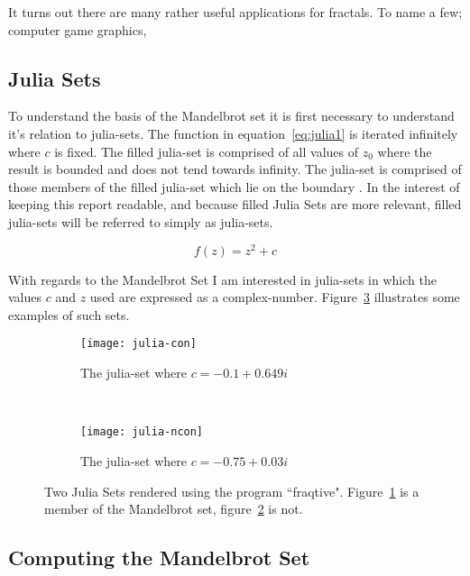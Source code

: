 It turns out there are many rather useful applications for fractals. To name a few; computer game graphics, %

\subsection*{Julia Sets}

To understand the basis of the Mandelbrot set it is first necessary to understand it's relation to \glspl{julia-set}.
The function in equation~\ref{eq:julia1} is iterated infinitely where \(c\) is fixed.
The \gls{filled julia-set} is comprised of all values of \(z_0\) where the result is bounded and does not tend towards infinity.
The \gls{julia-set} is comprised of those members of the \gls{filled julia-set} which lie on the boundary \cite{chaosfract}.
In the interest of keeping this report readable, and because filled Julia Sets are more relevant, \glspl{filled julia-set} will be 
referred to simply as \glspl{julia-set}.

\begin{equation}\label{eq:julia1}
f(z) = z^2 + c
\end{equation}

With regards to the Mandelbrot Set I am interested in \glspl{julia-set} in which the values \(c\) and \(z\) used are expressed as a 
\gls{complex-number}. Figure~\ref{fig:juliaimgs} illustrates some examples of such sets. 

\begin{figure}[h]
\centering
\begin{subfigure}[b]{0.48\textwidth}
  \centering    
  \texttt{[image: julia-con]}
  \caption{
    \tiny The \gls{julia-set} where \(c = -0.1 + 0.649i\)
  }
  \label{fig:juliaimgcon}
\end{subfigure}
~ %
\begin{subfigure}[b]{0.48\textwidth}
  \centering
  \texttt{[image: julia-ncon]}
  \caption{
    \tiny The \gls{julia-set} where \(c = -0.75 + 0.03i\)
  }
  \label{fig:juliaimgncon}
\end{subfigure}
\caption{
  Two Julia Sets rendered using the program ``fraqtive"\cite{fraqtive}. 
  Figure~\ref{fig:juliaimgcon} is a member of the Mandelbrot set, 
  figure~\ref{fig:juliaimgncon} is not.
}
\label{fig:juliaimgs}
\end{figure}

\subsection*{Computing the Mandelbrot Set}

